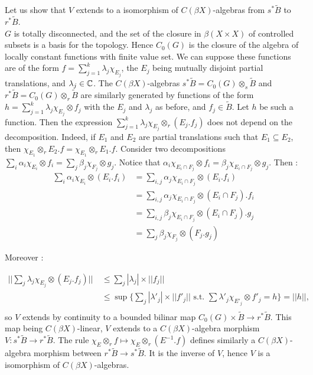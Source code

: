 \begin{dem}
Let us show that $V$ extends to a isomorphism of $C(\beta X)$-algebras from $s^* \tilde B$ to $r^*\tilde B$.\\

$G$ is totally disconnected, and the set of the closure in $\beta (X\times X)$ of controlled subsets is a basis for the topology. Hence $C_0(G)$ is the closure of the algebra of locally constant functions with finite value set. We can suppose these functions are of the form $f = \sum_{j=1}^k \lambda_j\chi_{E_j}$, the $E_j$ being mutually disjoint partial translations, and $\lambda_j\in \mathbb C$. The $C(\beta X)$-algebras $s^* \tilde B = C_0(G) \otimes_s \tilde B$ and $r^* \tilde B = C_0(G) \otimes_r \tilde B$ are similarly generated by functions of the form $h = \sum_{j=1}^k \lambda_j\chi_{E_j}\otimes f_j$ with the $E_j$ and $\lambda_j$ as before, and $f_j\in\tilde B$. Let $h$ be such a function. Then the expression $\sum_{j=1}^k \lambda_j\chi_{E_j}\otimes_r (E_j.f_j)$ does not depend on the decomposition. Indeed, if $E_1$ and $E_2$ are partial translations such that $E_1\subseteq E_2$, then $\chi_{E_1} \otimes_r E_2.f = \chi_{E_1} \otimes_r E_1.f $. Consider two decompositions $\sum_{i} \alpha_i\chi_{E_i}\otimes f_i= \sum_{j} \beta_j\chi_{F_j}\otimes g_j$. Notice that $\alpha_i \chi_{E_i\cap F_j }\otimes f_i = \beta_j \chi_{E_i\cap F_j }\otimes g_j$. Then :
\[ \begin{array}{rl}
  \sum_{i} \alpha_i\chi_{E_i}\otimes (E_i.f_i)  & = \sum_{i,j} \alpha_j\chi_{E_i\cap F_j}\otimes (E_i.f_i)         \\
						& = \sum_{i,j} \alpha_j\chi_{E_i\cap F_j}\otimes (E_i\cap F_j).f_i \\
						& = \sum_{i,j} \beta_j\chi_{E_i\cap F_j}\otimes (E_i\cap F_j).g_j  \\
						& = \sum_{j} \beta_j\chi_{F_j}\otimes (F_j.g_j)
\end{array}\]

Moreover :

\[ \begin{array}{rl} 
||\sum_j \lambda_j\chi_{E_j}\otimes (E_j.f_j)|| 
 \ & \leq \sum_j |\lambda_j| \times  ||f_j|| \\ 
 \ & \leq \sup \{ \sum_j |\lambda'_j| \times  ||f'_j||\text{ s.t. }\sum \lambda'_j \chi_{E'_j}\otimes f'_j  =h\}=||h||, \\ 
\end{array}\]
so $V$ extends by continuity to a bounded bilinar map $ C_0(G)\times\tilde B \rightarrow r^* \tilde B$. This map being $C(\beta X)$-linear, $V$ extends to a $C(\beta X)$-algebra morphism $V :s^*\tilde B \rightarrow r^* \tilde B$. The rule $\chi_E \otimes_r f\mapsto \chi_E \otimes_r (E^{-1}.f)$ defines similarly a $C(\beta X)$-algebra morphism between $r^*\tilde B \rightarrow s^*\tilde B$. It is the inverse of $V$, hence $V$ is a isomorphism of $C(\beta X)$-algebras.\\


\end{dem}
